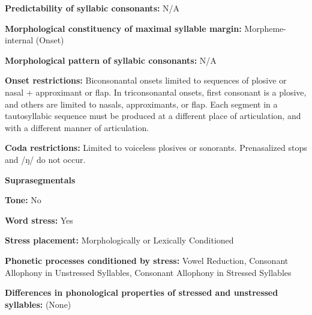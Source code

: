 \begin{styleBody}
\textbf{Predictability of syllabic consonants:} N/A 
\end{styleBody}

\begin{styleBody}
\textbf{Morphological constituency of maximal syllable margin:} Morpheme-internal (Onset)
\end{styleBody}

\begin{styleBody}
\textbf{Morphological pattern of syllabic consonants:} N/A
\end{styleBody}

\begin{styleBody}
\textbf{Onset restrictions:} Biconsonantal onsets limited to sequences of plosive or nasal + approximant or flap. In triconsonantal onsets, first consonant is a plosive, and others are limited to nasals, approximants, or flap. Each segment in a tautosyllabic sequence must be produced at a different place of articulation, and with a different manner of articulation.
\end{styleBody}

\begin{styleBody}
\textbf{Coda restrictions:} Limited to voiceless plosives or sonorants. Prenasalized stops and /ŋ/ do not occur.
\end{styleBody}

\begin{styleBody}
\textbf{Suprasegmentals}
\end{styleBody}

\begin{styleBody}
\textbf{Tone:} No
\end{styleBody}

\begin{styleBody}
\textbf{Word stress:} Yes
\end{styleBody}

\begin{styleBody}
\textbf{Stress placement:} Morphologically or Lexically Conditioned
\end{styleBody}

\begin{styleBody}
\textbf{Phonetic processes conditioned by stress:} Vowel Reduction, Consonant Allophony in Unstressed Syllables, Consonant Allophony in Stressed Syllables
\end{styleBody}

\begin{styleBody}
\textbf{Differences in phonological properties of stressed and unstressed syllables:} (None)
\end{styleBody}

